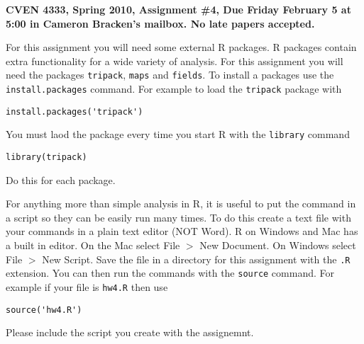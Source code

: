 \documentclass[11pt]{article}
\begin{document}
\textbf{CVEN 4333, Spring 2010, Assignment \#4, Due Friday February 5 at 5:00 in Cameron Bracken's mailbox. No late papers accepted.}


For this assignment you will need some external \textsf{R} packages.  \textsf{R} packages contain extra functionality for a wide variety of analysis. For this assignment you will need the packages \texttt{tripack}, \texttt{maps} and \texttt{fields}.  To install a packages use the \texttt{install.packages} command. For example to load the \texttt{tripack} package with 

\begin{verbatim}
install.packages('tripack')
\end{verbatim}

You must laod the package every time you start \textsf{R} with the \texttt{library} command 
\begin{verbatim}
library(tripack)
\end{verbatim}
Do this for each package. 

For anything more than simple analysis in \textsf{R}, it is useful to put the command in a script so they can be easily run many times.  To do this create a text file with your commands in a plain text editor (NOT Word). \textsf{R} on Windows and Mac has a built in editor.  On the Mac select File $>$ New Document. On Windows select File $>$ New Script.  Save the file in a directory for this assignment with the \texttt{.R} extension.  You can then run the commands with the \texttt{source} command.  For example if your file is \texttt{hw4.R} then use
\begin{verbatim}
source('hw4.R')
\end{verbatim} 
Please include the script you create with the assignemnt.    
\end{document}
